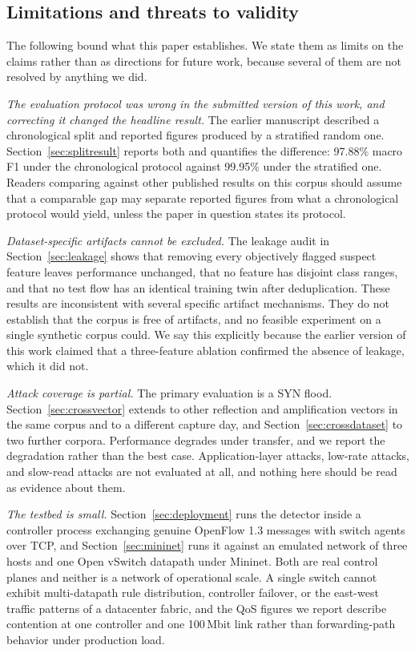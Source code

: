 \documentclass{ieeeaccess}
\begin{document}
\subsection{Limitations and threats to validity}
\label{sec:limitations}
The following bound what this paper establishes. We state them as limits on the claims rather than as directions for future work, because several of them are not resolved by anything we did.

\emph{The evaluation protocol was wrong in the submitted version of this work, and correcting it changed the headline result.} The earlier manuscript described a chronological split and reported figures produced by a stratified random one. Section~\ref{sec:splitresult} reports both and quantifies the difference: 97.88\% macro F1 under the chronological protocol against 99.95\% under the stratified one. Readers comparing against other published results on this corpus should assume that a comparable gap may separate reported figures from what a chronological protocol would yield, unless the paper in question states its protocol.

\emph{Dataset-specific artifacts cannot be excluded.} The leakage audit in Section~\ref{sec:leakage} shows that removing every objectively flagged suspect feature leaves performance unchanged, that no feature has disjoint class ranges, and that no test flow has an identical training twin after deduplication. These results are inconsistent with several specific artifact mechanisms. They do not establish that the corpus is free of artifacts, and no feasible experiment on a single synthetic corpus could. We say this explicitly because the earlier version of this work claimed that a three-feature ablation confirmed the absence of leakage, which it did not.

\emph{Attack coverage is partial.} The primary evaluation is a SYN flood. Section~\ref{sec:crossvector} extends to other reflection and amplification vectors in the same corpus and to a different capture day, and Section~\ref{sec:crossdataset} to two further corpora. Performance degrades under transfer, and we report the degradation rather than the best case. Application-layer attacks, low-rate attacks, and slow-read attacks are not evaluated at all, and nothing here should be read as evidence about them.

\emph{The testbed is small.} Section~\ref{sec:deployment} runs the detector inside a controller process exchanging genuine OpenFlow 1.3 messages with switch agents over TCP, and Section~\ref{sec:mininet} runs it against an emulated network of three hosts and one Open vSwitch datapath under Mininet. Both are real control planes and neither is a network of operational scale. A single switch cannot exhibit multi-datapath rule distribution, controller failover, or the east-west traffic patterns of a datacenter fabric, and the QoS figures we report describe contention at one controller and one 100\,Mbit link rather than forwarding-path behavior under production load.
\end{document}

